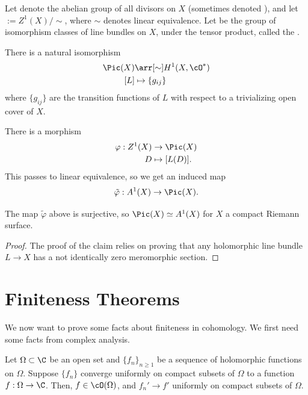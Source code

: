 \documentclass[11pt]{report}
\begin{document}
\begin{defn}
    Let  
    denote the abelian group of all divisors on $X$ 
    (sometimes denoted ), 
    and let  $:= Z^1(X)/\sim$, where $\sim$ denotes linear equivalence. 
    Let  be the group of isomorphism classes of line bundles on $X$, under the tensor product, called the .
\end{defn}

\begin{rmk}
    There is a natural isomorphism
    \begin{align*}
        \Pic(X) &\arr[\sim] H^1(X, \cO^*) \\ [L] & \mapsto \{g_{ij}\}
    \end{align*}
    where $\{g_{ij}\}$ are the transition functions of $L$ with respect to a trivializing open cover of $X$.
\end{rmk}

\begin{rmk}
    There is a morphism 
    \begin{align*}
        \varphi: Z^1(X) & \to \Pic(X) \\ D & \mapsto [L(D)].
    \end{align*}
    This passes to linear equivalence, so we get an induced map
    \[
    \tilde \varphi :A^1(X) \to \Pic(X).
    \]
\end{rmk}

\begin{thm}
    The map $\tilde \varphi$ above is surjective, so $\Pic(X) \simeq A^1(X)$ for $X$ a compact Riemann surface.
\end{thm}

\begin{proof}
    The proof of the claim relies on proving that any holomorphic line bundle $L \to X$ has a not identically zero meromorphic section.
\end{proof}

\section{Finiteness Theorems}

We now want to prove some facts about finiteness in cohomology. We first need some facts from complex analysis.

\begin{thm}
    Let $\Omega \subset \C$ be an open set and $\{f_n\}_{n \ge 1}$ be a sequence of holomorphic functions on $\Omega$. Suppose $\{f_n\}$ converge uniformly on compact subsets of $\Omega$ to a function $f:\Omega \to \C$. Then, $f \in \cO(\Omega)$, and $f_n' \to f'$ uniformly on compact subsets of $\Omega$.
\end{thm}
\end{document}
